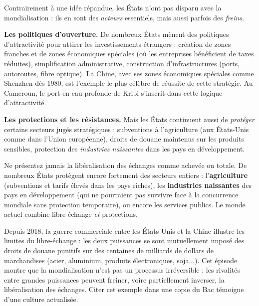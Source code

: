 \documentclass[11pt]{article}
\newcommand{\cle}[1]{{\popxbold\color{popdark}#1}}
\newcounter{popsec}
\newcounter{popsub}
\newcommand{\courssub}[1]{%
  \stepcounter{popsub}%
  \par\vspace{9pt}\noindent{\popxbold\fontsize{11.5}{13}\selectfont\color{popink}{\color{poporange}\thepopsec.\thepopsub}\hspace{6pt}#1}\par\nopagebreak\vspace{4pt}
}
\begin{document}
\courssub{Le rôle des États : ouverture et résistances}

Contrairement à une idée répandue, les États n'ont pas disparu avec la mondialisation : ils en sont des \emph{acteurs} essentiels, mais aussi parfois des \emph{freins}.

\textbf{Les politiques d'ouverture.} De nombreux États mènent des politiques d'\cle{attractivité} pour attirer les investissements étrangers : création de \cle{zones franches} et de zones économiques spéciales (où les entreprises bénéficient de taxes réduites), simplification administrative, construction d'infrastructures (ports, autoroutes, fibre optique). La Chine, avec ses zones économiques spéciales comme Shenzhen dès 1980, est l'exemple le plus célèbre de réussite de cette stratégie. Au Cameroun, le port en eau profonde de Kribi s'inscrit dans cette logique d'attractivité.

\textbf{Les protections et les résistances.} Mais les États continuent aussi de \emph{protéger} certains secteurs jugés stratégiques : subventions à l'agriculture (aux États-Unis comme dans l'Union européenne), droits de douane maintenus sur les produits sensibles, protection des \emph{industries naissantes} dans les pays en développement.

\begin{attention}
Ne présentez jamais la libéralisation des échanges comme achevée ou totale. De nombreux États protègent encore fortement des secteurs entiers : l'\textbf{agriculture} (subventions et tarifs élevés dans les pays riches), les \textbf{industries naissantes} des pays en développement (qui ne pourraient pas survivre face à la concurrence mondiale sans protection temporaire), ou encore les services publics. Le monde actuel combine libre-échange \emph{et} protections.
\end{attention}

\begin{savaistu}
Depuis 2018, la \cle{guerre commerciale entre les États-Unis et la Chine} illustre les limites du libre-échange : les deux puissances se sont mutuellement imposé des droits de douane punitifs sur des centaines de milliards de dollars de marchandises (acier, aluminium, produits électroniques, soja...). Cet épisode montre que la mondialisation n'est pas un processus irréversible : les rivalités entre grandes puissances peuvent freiner, voire partiellement inverser, la libéralisation des échanges. Citer cet exemple dans une copie du Bac témoigne d'une culture actualisée.
\end{savaistu}
\end{document}
